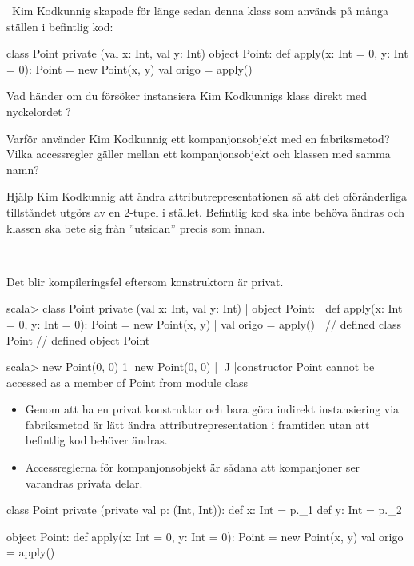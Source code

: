 \QUESTBEGIN

\Task \what~Kim Kodkunnig skapade för länge sedan denna klass som används på många ställen i befintlig kod:

\begin{Code}
class Point private (val x: Int, val y: Int)
object Point:
  def apply(x: Int = 0, y: Int = 0): Point = new Point(x, y)
  val origo = apply()
\end{Code}

\Subtask Vad händer om du försöker instansiera Kim Kodkunnigs klass direkt med nyckelordet ?

\Subtask Varför använder Kim Kodkunnig ett kompanjonsobjekt med en fabriksmetod? Vilka accessregler gäller mellan ett kompanjonsobjekt och klassen med samma namn?

\Subtask Hjälp Kim Kodkunnig att ändra attributrepresentationen så att det oföränderliga tillståndet utgörs av en 2-tupel  i stället. Befintlig kod ska inte behöva ändras och klassen  ska bete sig från ''utsidan'' precis som innan.

\SOLUTION

\TaskSolved \what~

\SubtaskSolved Det blir kompileringsfel eftersom konstruktorn är privat.
\begin{REPL}
scala> class Point private (val x: Int, val y: Int)
     | object Point:
     |   def apply(x: Int = 0, y: Int = 0): Point = new Point(x, y)
     |   val origo = apply()
     |
// defined class Point
// defined object Point

scala> new Point(0, 0)
1 |new Point(0, 0)
  |    ^^^^^
  |constructor Point cannot be accessed as a member of Point from module class
\end{REPL}

\SubtaskSolved
\begin{itemize}
  \item Genom att ha en privat konstruktor och bara göra indirekt instansiering via fabriksmetod är lätt ändra attributrepresentation i framtiden utan att befintlig kod behöver ändras.

  \item Accessreglerna för kompanjonsobjekt är sådana att kompanjoner ser varandras privata delar.
\end{itemize}

\SubtaskSolved

\begin{Code}
class Point private (private val p: (Int, Int)):
  def x: Int = p._1
  def y: Int = p._2

object Point:
  def apply(x: Int = 0, y: Int = 0): Point = new Point(x, y)
  val origo = apply()
\end{Code}

